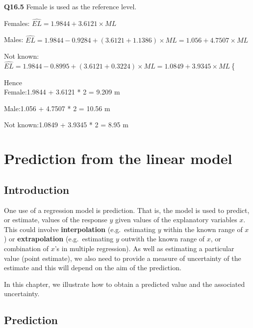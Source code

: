 \documentclass[
  oneside]{krantz}
\begin{document}
\textbf{Q16.5} Female is used as the reference level.
\raggedright
Females:\hspace{15pt} \(\hat{EL}=1.9844+3.6121\times{}ML\ \)
\raggedright
Males:\hspace{15pt}\hspace{15pt}
\(\hat{EL}=1.9844-0.9284+\left(3.6121+1.1386\right)\times{}ML=1.056+4.7507\times{}ML\
\)
\raggedright
Not known:\hspace{15pt}
\(\hat{EL}=1.9844-0.8995+\left(3.6121+0.3224\right)\times{}ML=1.0849+3.9345\times{}ML\
\)\{\raggedright
Hence\\
Female:\hspace{15pt}\hspace{15pt}1.9844 + 3.6121 * 2 = 9.209 m\\
\raggedright    
Male:\hspace{15pt}\hspace{15pt}1.056 + 4.7507 * 2 = 10.56 m\\
\raggedright  
Not known:\hspace{15pt}1.0849 + 3.9345 * 2 = 8.95 m

\hypertarget{prediction}{%
\chapter{Prediction from the linear model}\label{prediction}}

\hypertarget{INTpred}{%
\section{Introduction}\label{INTpred}}

One use of a regression model is prediction. That is, the model is used to predict, or estimate, values of the response \(y\) given values of the explanatory variables \(x\). This could involve \textbf{interpolation} (e.g.~estimating \(y\) within the known range of \(x\)) or \textbf{extrapolation} (e.g.~estimating \(y\) outwith the known range of \(x\), or combination of \(x\)'s in multiple regression). As well as estimating a particular value (point estimate), we also need to provide a measure of uncertainty of the estimate and this will depend on the aim of the prediction.

In this chapter, we illustrate how to obtain a predicted value and the associated uncertainty.

\hypertarget{prediction-1}{%
\section{Prediction}\label{prediction-1}}
\end{document}
